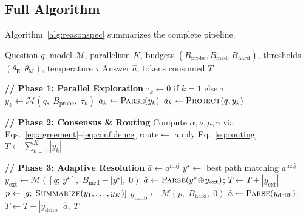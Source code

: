 \subsection{Full Algorithm}
\label{sec:method:algorithm}

Algorithm~\ref{alg:reasonspec} summarizes the complete \method{} pipeline.

\begin{algorithm}[t]
\caption{\method{}: Reasoning Speculation}
\label{alg:reasonspec}
\begin{algorithmic}[1]
\REQUIRE Question $q$, model $\mathcal{M}$, parallelism $K$,
  budgets $(B_{\mathrm{probe}}, B_{\mathrm{med}}, B_{\mathrm{hard}})$,
  thresholds $(\theta_{\mathrm{E}}, \theta_{\mathrm{M}})$,
  temperature $\tau$
\ENSURE Answer $\hat{a}$, tokens consumed $T$

\medskip
\STATE \textbf{// Phase 1: Parallel Exploration}
  \STATE $\tau_k \leftarrow 0$ if $k{=}1$ else $\tau$
    \hfill{}
  \STATE $y_k \leftarrow \mathcal{M}(q,\; B_{\mathrm{probe}},\; \tau_k)$
  \STATE $a_k \leftarrow \textsc{Parse}(y_k)$
    \STATE $a_k \leftarrow \textsc{Project}(q, y_k)$
      \hfill{}
  \ENDIF
\ENDFOR

\medskip
\STATE \textbf{// Phase 2: Consensus \& Routing}
\STATE Compute $\alpha, \nu, \mu, \gamma$ via
  Eqs.~\eqref{eq:agreement}--\eqref{eq:confidence}
\STATE $\mathrm{route} \leftarrow$ apply Eq.~\eqref{eq:routing}
\STATE $T \leftarrow \sum_{k=1}^{K} |y_k|$
  \hfill{}

\medskip
\STATE \textbf{// Phase 3: Adaptive Resolution}
  \STATE $\hat{a} \leftarrow a^{\mathrm{maj}}$
    \hfill{}
  \STATE $y^{\star} \leftarrow$ best path matching $a^{\mathrm{maj}}$
  \STATE $y_{\mathrm{ext}} \leftarrow \mathcal{M}(
    [q;\, y^{\star}],\; B_{\mathrm{med}} - |y^{\star}|,\; 0)$
  \STATE $\hat{a} \leftarrow \textsc{Parse}(y^{\star} \!\oplus\! y_{\mathrm{ext}})$;
    \;$T \leftarrow T + |y_{\mathrm{ext}}|$
\ELSE \hfill{}
  \STATE $p \leftarrow [q;\; \textsc{Summarize}(y_1, \ldots, y_K)]$
  \STATE $y_{\mathrm{delib}} \leftarrow \mathcal{M}(p,\;
    B_{\mathrm{hard}},\; 0)$
  \STATE $\hat{a} \leftarrow \textsc{Parse}(y_{\mathrm{delib}})$;
    \;$T \leftarrow T + |y_{\mathrm{delib}}|$
\ENDIF
\RETURN $\hat{a},\; T$
\end{algorithmic}
\end{algorithm}

